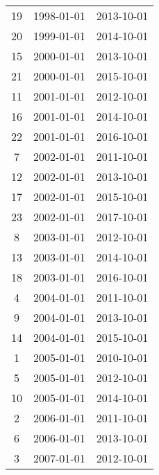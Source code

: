 % 
\begin{tabular}{ccc}
  \hline
  \hline
19 & 1998-01-01 & 2013-10-01 \\ 
  20 & 1999-01-01 & 2014-10-01 \\ 
  15 & 2000-01-01 & 2013-10-01 \\ 
  21 & 2000-01-01 & 2015-10-01 \\ 
  11 & 2001-01-01 & 2012-10-01 \\ 
  16 & 2001-01-01 & 2014-10-01 \\ 
  22 & 2001-01-01 & 2016-10-01 \\ 
  7 & 2002-01-01 & 2011-10-01 \\ 
  12 & 2002-01-01 & 2013-10-01 \\ 
  17 & 2002-01-01 & 2015-10-01 \\ 
  23 & 2002-01-01 & 2017-10-01 \\ 
  8 & 2003-01-01 & 2012-10-01 \\ 
  13 & 2003-01-01 & 2014-10-01 \\ 
  18 & 2003-01-01 & 2016-10-01 \\ 
  4 & 2004-01-01 & 2011-10-01 \\ 
  9 & 2004-01-01 & 2013-10-01 \\ 
  14 & 2004-01-01 & 2015-10-01 \\ 
  1 & 2005-01-01 & 2010-10-01 \\ 
  5 & 2005-01-01 & 2012-10-01 \\ 
  10 & 2005-01-01 & 2014-10-01 \\ 
  2 & 2006-01-01 & 2011-10-01 \\ 
  6 & 2006-01-01 & 2013-10-01 \\ 
  3 & 2007-01-01 & 2012-10-01 \\ 
   \hline
\end{tabular}
